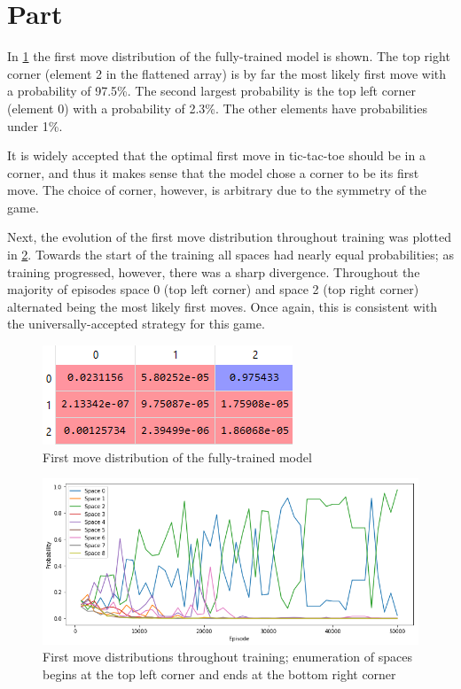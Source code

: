 \documentclass{article}
\newcommand{\enterproblemHeader}[1]{
}
\newcommand{\exitproblemHeader}[1]{
}
\newcounter{problem} %
\newcommand{\problemName}{}
\newenvironment{problem}[1][Part \theproblem]{ %
	\stepcounter{problem} %
	\renewcommand{\problemName}{#1} %
	\section{\problemName} %
	\enterproblemHeader{\problemName} %
}{
	\exitproblemHeader{\problemName} %
}
\begin{document}
\FloatBarrier
\begin{problem}
 In \cref{fig:final_firstmove_dist} the first move distribution of the fully-trained model is shown. The top right corner (element 2 in the flattened array) is by far the most likely first move with a probability of 97.5\%. The second largest probability is the top left corner (element 0) with a probability of 2.3\%. The other elements have probabilities under 1\%.
 
 It is widely accepted that the optimal first move in tic-tac-toe should be in a corner, and thus it makes sense that the model chose a corner to be its first move. The choice of corner, however, is arbitrary due to the symmetry of the game.
 
 Next, the evolution of the first move distribution throughout training was plotted in \cref{fig:changing_firstmove_dist}. Towards the start of the training all spaces had nearly equal probabilities; as training progressed, however, there was a sharp divergence. Throughout the majority of episodes space 0 (top left corner) and space 2 (top right corner) alternated being the most likely first moves. Once again, this is consistent with the universally-accepted strategy for this game.

    \begin{figure}
    \begin{center}
    \includegraphics[]{final_firstmove_dist}
    \caption{First move distribution of the fully-trained model}
    \label{fig:final_firstmove_dist}
    \end{center}
    \end{figure}
    
    \begin{figure}
    \includegraphics[width=\linewidth]{changing_firstmove_dist.png}
    \caption{First move distributions throughout training; enumeration of spaces begins at the top left corner and ends at the bottom right corner}
    \label{fig:changing_firstmove_dist}
    \end{figure}
	
\end{problem}
\clearpage
\end{document}
